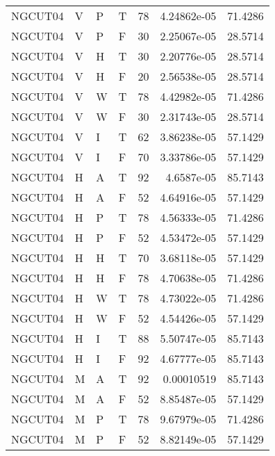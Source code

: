 \begin{longtable}{llllrrr}
    NGCUT04  & V     & P     & T          & 78         & 4.24862e-05 & 71.4286  \\
    NGCUT04  & V     & P     & F          & 30         & 2.25067e-05 & 28.5714  \\
    NGCUT04  & V     & H     & T          & 30         & 2.20776e-05 & 28.5714  \\
    NGCUT04  & V     & H     & F          & 20         & 2.56538e-05 & 28.5714  \\
    NGCUT04  & V     & W     & T          & 78         & 4.42982e-05 & 71.4286  \\
    NGCUT04  & V     & W     & F          & 30         & 2.31743e-05 & 28.5714  \\
    NGCUT04  & V     & I     & T          & 62         & 3.86238e-05 & 57.1429  \\
    NGCUT04  & V     & I     & F          & 70         & 3.33786e-05 & 57.1429  \\
    NGCUT04  & H     & A     & T          & 92         & 4.6587e-05  & 85.7143  \\
    NGCUT04  & H     & A     & F          & 52         & 4.64916e-05 & 57.1429  \\
    NGCUT04  & H     & P     & T          & 78         & 4.56333e-05 & 71.4286  \\
    NGCUT04  & H     & P     & F          & 52         & 4.53472e-05 & 57.1429  \\
    NGCUT04  & H     & H     & T          & 70         & 3.68118e-05 & 57.1429  \\
    NGCUT04  & H     & H     & F          & 78         & 4.70638e-05 & 71.4286  \\
    NGCUT04  & H     & W     & T          & 78         & 4.73022e-05 & 71.4286  \\
    NGCUT04  & H     & W     & F          & 52         & 4.54426e-05 & 57.1429  \\
    NGCUT04  & H     & I     & T          & 88         & 5.50747e-05 & 85.7143  \\
    NGCUT04  & H     & I     & F          & 92         & 4.67777e-05 & 85.7143  \\
    NGCUT04  & M     & A     & T          & 92         & 0.00010519  & 85.7143  \\
    NGCUT04  & M     & A     & F          & 52         & 8.85487e-05 & 57.1429  \\
    NGCUT04  & M     & P     & T          & 78         & 9.67979e-05 & 71.4286  \\
    NGCUT04  & M     & P     & F          & 52         & 8.82149e-05 & 57.1429  \\

\end{longtable}
